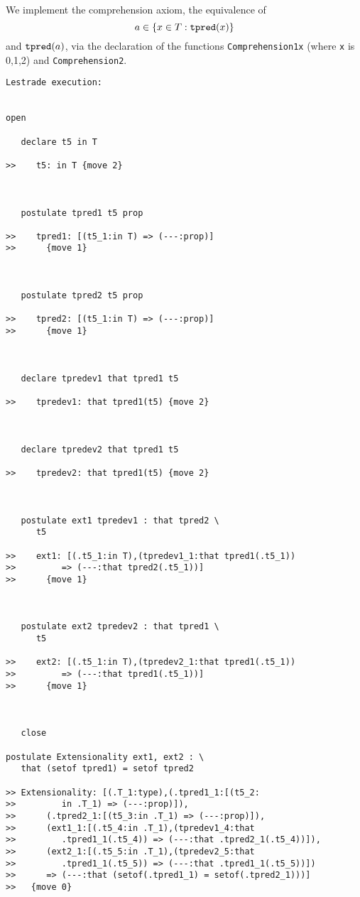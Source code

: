 \documentclass[12pt]{article}
\begin{document}
We implement the comprehension axiom, the equivalence of $$a \in \{x\in T:{\tt tpred}(x)\}$$ and ${\tt tpred}(a)$, via the declaration of the functions
{\tt Comprehension1x} (where {\tt x} is 0,1,2) and {\tt Comprehension2}.

\begin{verbatim}Lestrade execution:


open

   declare t5 in T

>>    t5: in T {move 2}



   postulate tpred1 t5 prop

>>    tpred1: [(t5_1:in T) => (---:prop)]
>>      {move 1}



   postulate tpred2 t5 prop

>>    tpred2: [(t5_1:in T) => (---:prop)]
>>      {move 1}



   declare tpredev1 that tpred1 t5

>>    tpredev1: that tpred1(t5) {move 2}



   declare tpredev2 that tpred1 t5

>>    tpredev2: that tpred1(t5) {move 2}



   postulate ext1 tpredev1 : that tpred2 \
      t5

>>    ext1: [(.t5_1:in T),(tpredev1_1:that tpred1(.t5_1))
>>         => (---:that tpred2(.t5_1))]
>>      {move 1}



   postulate ext2 tpredev2 : that tpred1 \
      t5

>>    ext2: [(.t5_1:in T),(tpredev2_1:that tpred1(.t5_1))
>>         => (---:that tpred1(.t5_1))]
>>      {move 1}



   close

postulate Extensionality ext1, ext2 : \
   that (setof tpred1) = setof tpred2

>> Extensionality: [(.T_1:type),(.tpred1_1:[(t5_2:
>>         in .T_1) => (---:prop)]),
>>      (.tpred2_1:[(t5_3:in .T_1) => (---:prop)]),
>>      (ext1_1:[(.t5_4:in .T_1),(tpredev1_4:that
>>         .tpred1_1(.t5_4)) => (---:that .tpred2_1(.t5_4))]),
>>      (ext2_1:[(.t5_5:in .T_1),(tpredev2_5:that
>>         .tpred1_1(.t5_5)) => (---:that .tpred1_1(.t5_5))])
>>      => (---:that (setof(.tpred1_1) = setof(.tpred2_1)))]
>>   {move 0}




\end{verbatim}
\end{document}

